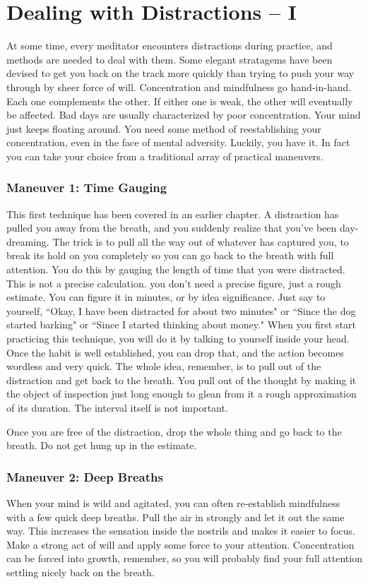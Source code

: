 \chapter{Dealing with Distractions -- I}

At some time, every meditator encounters distractions during practice, and
methods are needed to deal with them. Some elegant stratagems have been devised
to get you back on the track more quickly than trying to push your way through
by sheer force of will.  Concentration and mindfulness go hand-in-hand. Each one
complements the other.  If either one is weak, the other will eventually be
affected. Bad days are usually characterized by poor concentration. Your mind
just keeps floating around. You need some method of reestablishing your
concentration, even in the face of mental adversity. Luckily, you have it. In
fact you can take your choice from a traditional array of practical maneuvers.

\subsection*{Maneuver 1: Time Gauging} This first technique has been covered in an earlier
chapter. A distraction has pulled you away from the breath, and you suddenly
realize that you've been day-dreaming. The trick is to pull all the way out of
whatever has captured you, to break its hold on you completely so you can go
back to the breath with full attention. You do this by gauging the length of
time that you were distracted. This is not a precise calculation. you don't need
a precise figure, just a rough estimate. You can figure it in minutes, or by
idea significance. Just say to yourself, ``Okay, I have been distracted for about
two minutes" or ``Since the dog started barking" or ``Since I started thinking
about money." When you first start practicing this technique, you will do it by
talking to yourself inside your head. Once the habit is well established, you
can drop that, and the action becomes wordless and very quick. The whole idea,
remember, is to pull out of the distraction and get back to the breath. You pull
out of the thought by making it the object of inspection just long enough to
glean from it a rough approximation of its duration. The interval itself is not
important.

Once you are free of the distraction, drop the whole thing and go back to the
breath. Do not get hung up in the estimate.

\subsection*{Maneuver 2: Deep Breaths}
When your mind is wild and agitated, you can often re-establish mindfulness with
a few quick deep breaths. Pull the air in strongly and let it out the same way.
This increases the sensation inside the nostrils and makes it easier to focus.
Make a strong act of will and apply some force to your attention. Concentration
can be forced into growth, remember, so you will probably find your full
attention settling nicely back on the breath.

